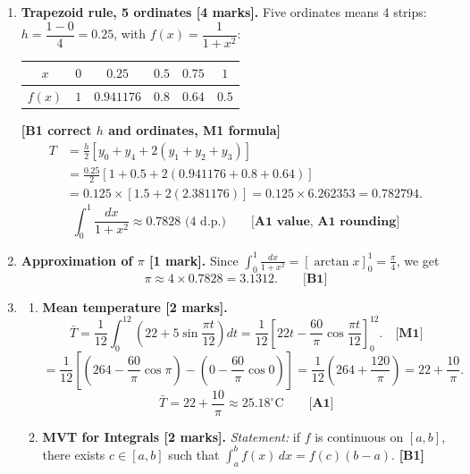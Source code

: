 \documentclass[11pt]{article}
\begin{document}
\begin{corrige}
\begin{enumerate}
\item \textbf{Trapezoid rule, 5 ordinates [4 marks].} Five ordinates means 4 strips: $h = \dfrac{1-0}{4} = 0.25$, with $f(x) = \dfrac{1}{1+x^2}$:
\begin{center}
\begin{tabular}{|c|ccccc|}
\hline
\rowcolor{popblueL} $x$ & $0$ & $0.25$ & $0.5$ & $0.75$ & $1$ \\
\hline
$f(x)$ & $1$ & $0.941176$ & $0.8$ & $0.64$ & $0.5$ \\
\hline
\end{tabular}
\end{center}
\textbf{[B1 correct $h$ and ordinates, M1 formula]}
\begin{align*}
T &= \frac{h}{2}\left[y_0 + y_4 + 2(y_1 + y_2 + y_3)\right] \\
&= \frac{0.25}{2}\left[1 + 0.5 + 2(0.941176 + 0.8 + 0.64)\right] \\
&= 0.125 \times \left[1.5 + 2(2.381176)\right] = 0.125 \times 6.262353 = 0.782794.
\end{align*}
\[
\boxed{\displaystyle\int_0^1 \frac{dx}{1+x^2} \approx 0.7828 \text{ (4 d.p.)}} \qquad \textbf{[A1 value, A1 rounding]}
\]

\item \textbf{Approximation of $\pi$ [1 mark].} Since $\displaystyle\int_0^1 \frac{dx}{1+x^2} = \left[\arctan x\right]_0^1 = \frac{\pi}{4}$, we get
\[
\pi \approx 4 \times 0.7828 = \boxed{3.1312}. \qquad \textbf{[B1]}
\]

\item 
\begin{enumerate}
\item \textbf{Mean temperature [2 marks].}
\[
\bar{T} = \frac{1}{12}\int_0^{12}\left(22 + 5\sin\frac{\pi t}{12}\right)dt = \frac{1}{12}\left[22t - \frac{60}{\pi}\cos\frac{\pi t}{12}\right]_0^{12}. \quad \textbf{[M1]}
\]
\[
= \frac{1}{12}\left[\left(264 - \frac{60}{\pi}\cos\pi\right) - \left(0 - \frac{60}{\pi}\cos 0\right)\right] = \frac{1}{12}\left(264 + \frac{120}{\pi}\right) = 22 + \frac{10}{\pi}.
\]
\[
\boxed{\bar{T} = 22 + \frac{10}{\pi} \approx 25.18^\circ\mathrm{C}} \qquad \textbf{[A1]}
\]

\item \textbf{MVT for Integrals [2 marks].} \emph{Statement:} if $f$ is continuous on $[a,b]$, there exists $c \in [a,b]$ such that $\displaystyle\int_a^b f(x)\,dx = f(c)(b-a)$. \textbf{[B1]}


\end{enumerate}
\end{enumerate}
\end{corrige}
\end{document}
